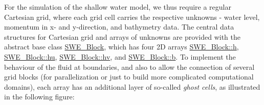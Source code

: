 For the simulation of the shallow water model, we thus require a regular Cartesian grid, where each grid cell carries the respective unknowns -\/ water level, momentum in x-\/ and y-\/direction, and bathymetry data. The central data structures for Cartesian grid and arrays of unknowns are provided with the abstract base class \hyperlink{classSWE__Block}{S\-W\-E\-\_\-\-Block}, which has four 2\-D arrays \hyperlink{classSWE__Block_a64a0f8f437f38b5f3b8ec5b4abdb864e}{S\-W\-E\-\_\-\-Block\-::h}, \hyperlink{classSWE__Block_aec2c1278fdb23f083216d8d397f26060}{S\-W\-E\-\_\-\-Block\-::hu}, \hyperlink{classSWE__Block_a0897aa3c2d78749f209c95e08196d831}{S\-W\-E\-\_\-\-Block\-::hv}, and \hyperlink{classSWE__Block_af7487209129f40b26ea171762754a261}{S\-W\-E\-\_\-\-Block\-::b}. To implement the behaviour of the fluid at boundaries, and also to allow the connection of several grid blocks (for parallelization or just to build more complicated computational domains), each array has an additional layer of so-\/called {\itshape ghost cells}, as illustrated in the following figure\-:



